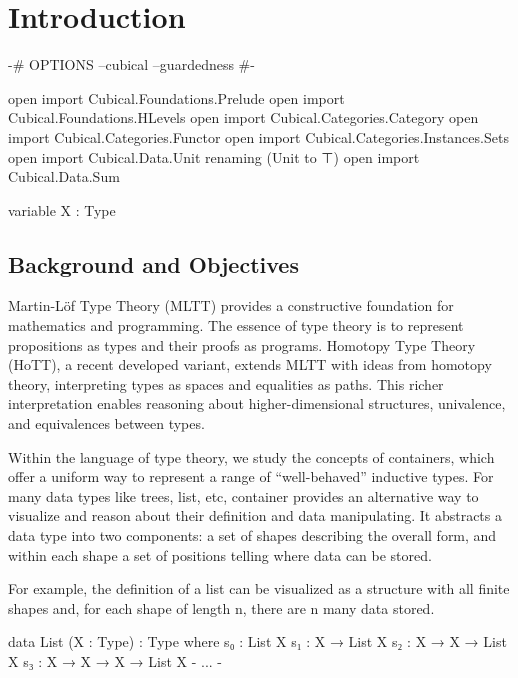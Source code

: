 \chapter{Introduction}

\begin{code}[hide]
{-# OPTIONS --cubical --guardedness #-}

open import Cubical.Foundations.Prelude
open import Cubical.Foundations.HLevels
open import Cubical.Categories.Category
open import Cubical.Categories.Functor
open import Cubical.Categories.Instances.Sets
open import Cubical.Data.Unit renaming (Unit to ⊤)
open import Cubical.Data.Sum

variable X : Type
\end{code}

\section{Background and Objectives}

Martin-Löf Type Theory (MLTT)\cite{martin1984intuitionistic}\cite{martin1998intuitionistic} provides a constructive foundation for mathematics and programming. The essence of type theory is to represent propositions as types and their proofs as programs\cite{curry1934functionality}. Homotopy Type Theory (HoTT)\cite{program2013homotopy}, a recent developed variant, extends MLTT with ideas from homotopy theory, interpreting types as spaces and equalities as paths. This richer interpretation enables reasoning about higher-dimensional structures, univalence, and equivalences between types.

Within the language of type theory, we study the concepts of containers\cite{abbott2003categories}\cite{abbott2005containers}, which offer a uniform way to represent a range of ``well-behaved'' inductive types. For many data types like trees, list, etc, container provides an alternative way to visualize and reason about their definition and data manipulating. It abstracts a data type into two components: a set of shapes describing the overall form, and within each shape a set of positions telling where data can be stored.

For example, the definition of a list can be visualized as a structure with all finite shapes and, for each shape of length n, there are n many data stored.

\begin{code}
data List (X : Type) : Type where
  s₀ : List X
  s₁ : X → List X
  s₂ : X → X → List X
  s₃ : X → X → X → List X
  {- ... -}
\end{code}

